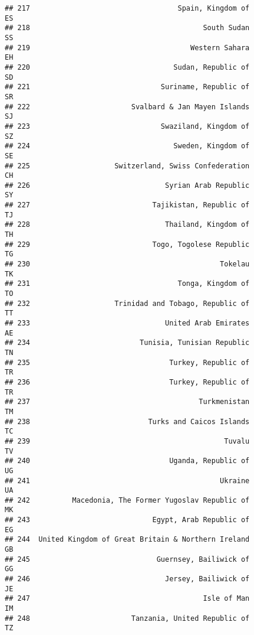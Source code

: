 \documentclass[
]{article}
\begin{document}
\begin{verbatim}
## 217                                   Spain, Kingdom of                      ES
## 218                                         South Sudan                      SS
## 219                                      Western Sahara                      EH
## 220                                  Sudan, Republic of                      SD
## 221                               Suriname, Republic of                      SR
## 222                        Svalbard & Jan Mayen Islands                      SJ
## 223                               Swaziland, Kingdom of                      SZ
## 224                                  Sweden, Kingdom of                      SE
## 225                    Switzerland, Swiss Confederation                      CH
## 226                                Syrian Arab Republic                      SY
## 227                             Tajikistan, Republic of                      TJ
## 228                                Thailand, Kingdom of                      TH
## 229                             Togo, Togolese Republic                      TG
## 230                                             Tokelau                      TK
## 231                                   Tonga, Kingdom of                      TO
## 232                    Trinidad and Tobago, Republic of                      TT
## 233                                United Arab Emirates                      AE
## 234                          Tunisia, Tunisian Republic                      TN
## 235                                 Turkey, Republic of                      TR
## 236                                 Turkey, Republic of                      TR
## 237                                        Turkmenistan                      TM
## 238                            Turks and Caicos Islands                      TC
## 239                                              Tuvalu                      TV
## 240                                 Uganda, Republic of                      UG
## 241                                             Ukraine                      UA
## 242          Macedonia, The Former Yugoslav Republic of                      MK
## 243                             Egypt, Arab Republic of                      EG
## 244  United Kingdom of Great Britain & Northern Ireland                      GB
## 245                              Guernsey, Bailiwick of                      GG
## 246                                Jersey, Bailiwick of                      JE
## 247                                         Isle of Man                      IM
## 248                        Tanzania, United Republic of                      TZ

\end{verbatim}
\end{document}
